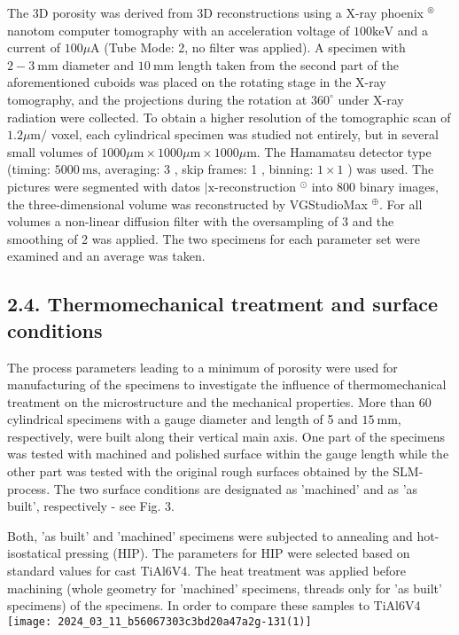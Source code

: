 \documentclass[10pt]{article}
\begin{document}
The 3D porosity was derived from 3D reconstructions using a X-ray phoenix ${ }^{\circledR}$ nanotom computer tomography with an acceleration voltage of $100 \mathrm{keV}$ and a current of $100 \mu \mathrm{A}$ (Tube Mode: 2, no filter was applied). A specimen with $2-3 \mathrm{~mm}$ diameter and $10 \mathrm{~mm}$ length taken from the second part of the aforementioned cuboids was placed on the rotating stage in the X-ray tomography, and the projections during the rotation at $360^{\circ}$ under X-ray radiation were collected. To obtain a higher resolution of the tomographic scan of $1.2 \mu \mathrm{m} /$ voxel, each cylindrical specimen was studied not entirely, but in several small volumes of $1000 \mu \mathrm{m} \times 1000 \mu \mathrm{m} \times 1000 \mu \mathrm{m}$. The Hamamatsu detector type (timing: $5000 \mathrm{~ms}$, averaging: 3 , skip frames: 1 , binning: $1 \times 1$ ) was used. The pictures were segmented with datos $\mid \mathrm{x}$-reconstruction ${ }^{\odot}$ into 800 binary images, the three-dimensional volume was reconstructed by VGStudioMax ${ }^{\oplus}$. For all volumes a non-linear diffusion filter with the oversampling of 3 and the smoothing of 2 was applied. The two specimens for each parameter set were examined and an average was taken.

\subsection*{2.4. Thermomechanical treatment and surface conditions}
The process parameters leading to a minimum of porosity were used for manufacturing of the specimens to investigate the influence of thermomechanical treatment on the microstructure and the mechanical properties. More than 60 cylindrical specimens with a gauge diameter and length of 5 and $15 \mathrm{~mm}$, respectively, were built along their vertical main axis. One part of the specimens was tested with machined and polished surface within the gauge length while the other part was tested with the original rough surfaces obtained by the SLM-process. The two surface conditions are designated as 'machined' and as 'as built', respectively - see Fig. 3.

Both, 'as built' and 'machined' specimens were subjected to annealing and hot-isostatical pressing (HIP). The parameters for HIP were selected based on standard values for cast TiAl6V4. The heat treatment was applied before machining (whole geometry for 'machined' specimens, threads only for 'as built' specimens) of the specimens. In order to compare these samples to TiAl6V4\\
\texttt{[image: 2024\_03\_11\_b56067303c3bd20a47a2g-131(1)]}
\end{document}
